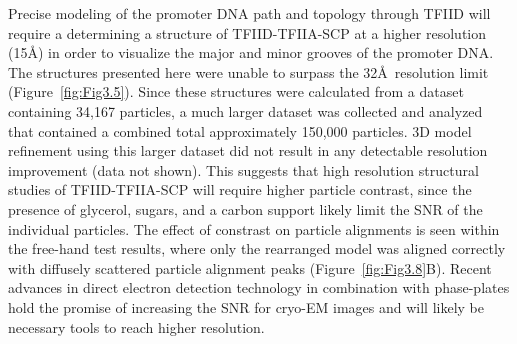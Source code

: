 \indent Precise modeling of the promoter DNA path and topology through TFIID will require a determining a structure of TFIID-TFIIA-SCP at a higher resolution (15\AA) in order to visualize the major and minor grooves of the promoter DNA. The structures presented here were unable to surpass the 32\AA\ resolution limit (Figure~\ref{fig:Fig3.5}). Since these structures were calculated from a dataset containing 34,167 particles, a much larger dataset was collected and analyzed that contained a combined total approximately 150,000 particles. 3D model refinement using this larger dataset did not result in any detectable resolution improvement (data not shown). This suggests that high resolution structural studies of TFIID-TFIIA-SCP will require higher particle contrast, since the presence of glycerol, sugars, and a carbon support likely limit the SNR of the individual particles. The effect of constrast on particle alignments is seen within the free-hand test results, where only the rearranged model was aligned correctly with diffusely scattered particle alignment peaks (Figure~\ref{fig:Fig3.8}B). Recent advances in direct electron detection technology \cite{Milazzo_2011,Campell_2012} in combination with phase-plates \cite{Hall_2011,Nagayama_2011} hold the promise of increasing the SNR for cryo-EM images and will likely be necessary tools to reach higher resolution.\\


